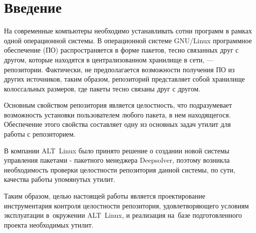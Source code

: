 \section*{Введение}

На современные компьютеры необходимо устанавливать сотни программ в рамках
одной операционной системы. В операционной системе GNU/Linux программное 
обеспечение (ПО) распространяется в форме пакетов, тесно связанных друг с другом,
которые находятся в централизованном хранилище в сети, --- репозитории. 
Фактически, не предполагается возможности получения ПО из 
других источников, таким образом, репозиторий представляет собой хранилище 
колоссальных размеров, где пакеты тесно связаны друг с другом.

Основным свойством репозитория является целостность, что подразумевает
возможность установки пользователем любого пакета, в нем находящегося. 
Обеспечение этого свойства составляет одну из основных задач утилит для 
работы с репозиторием. 

В компании  ALT~Linux было принято решение о создании новой системы
управления пакетами  - пакетного менеджера Deepsolver, поэтому возникла 
необходимость проверки целостности репозитория данной системы, по сути, 
качества работы упомянутых утилит. 

Таким образом, целью настоящей работы является проектирование 
инструментария контроля целостности репозитория, удовлетворяющего условиям эксплуатации в~окружении ALT~Linux, 
и реализация на~базе подготовленного проекта необходимых утилит.
